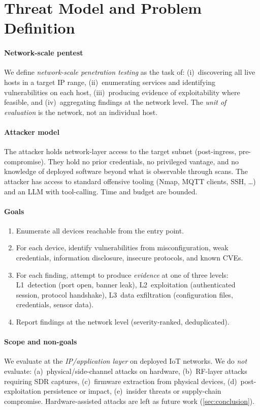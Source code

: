 
\section{Threat Model and Problem Definition}
\label{sec:threat}

\paragraph{Network-scale pentest}
We define \emph{network-scale penetration testing} as the task of: (i)~discovering
all live hosts in a target IP range, (ii)~enumerating services and identifying
vulnerabilities on each host, (iii)~producing evidence of exploitability where
feasible, and (iv)~aggregating findings at the network level. The \emph{unit of
evaluation} is the network, not an individual host.

\paragraph{Attacker model}
The attacker holds network-layer access to the target subnet (post-ingress,
pre-compromise). They hold no prior credentials, no privileged vantage, and no
knowledge of deployed software beyond what is observable through scans. The
attacker has access to standard offensive tooling (Nmap, MQTT clients, SSH, \ldots)
and an LLM with tool-calling. Time and budget are bounded.

\paragraph{Goals}
\begin{enumerate}
  \item Enumerate all devices reachable from the entry point.
  \item For each device, identify vulnerabilities from misconfiguration, weak
  credentials, information disclosure, insecure protocols, and known CVEs.
  \item For each finding, attempt to produce \emph{evidence} at one of three
  levels: \textsf{L1}~detection (port open, banner leak), \textsf{L2}~exploitation
  (authenticated session, protocol handshake), \textsf{L3}~data exfiltration
  (configuration files, credentials, sensor data).
  \item Report findings at the network level (severity-ranked, deduplicated).
\end{enumerate}

\paragraph{Scope and non-goals}
We evaluate at the \emph{IP/application layer} on deployed IoT networks. We
do \emph{not} evaluate: (a)~physical/side-channel attacks on hardware,
(b)~RF-layer attacks requiring SDR captures,
(c)~firmware extraction from physical devices,
(d)~post-exploitation persistence or impact,
(e)~insider threats or supply-chain compromise.
Hardware-assisted attacks are left as future work (\cref{sec:conclusion}).
